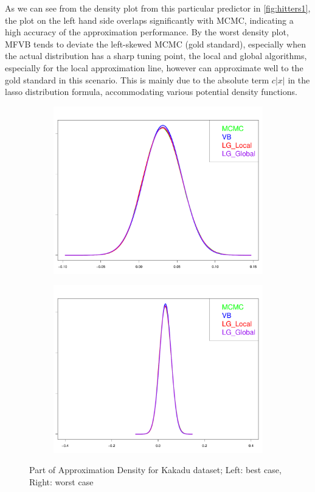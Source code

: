 As we can see from the density plot from this particular predictor in \autoref{fig:hitters1}, the plot on the left hand side overlaps significantly with MCMC, indicating a high accuracy of the approximation performance.
By the worst density plot, MFVB tends to deviate the left-skewed MCMC (gold standard), especially when the actual distribution has a sharp tuning point, the local and global algorithms, especially for the local approximation line, however can approximate well to the gold standard in this scenario. This is mainly due to the absolute term $c|x|$ in the lasso distribution formula, accommodating various potential density functions.\\
\begin{figure}[h]
	\begin{subfigure}{0.5\textwidth}
		\centering
		\includegraphics[page = 1, width=\linewidth,keepaspectratio]{lasso_densities_Kakadu.pdf}
	\end{subfigure}
	\begin{subfigure}{0.5\textwidth}
		\includegraphics[page = 2, width=\linewidth,keepaspectratio]{lasso_densities_Kakadu-1.pdf}
	\end{subfigure}
	\caption{Part of Approximation Density for Kakadu dataset; Left: best case, Right: worst case}
	\label{fig:Kakadu}
\end{figure}
